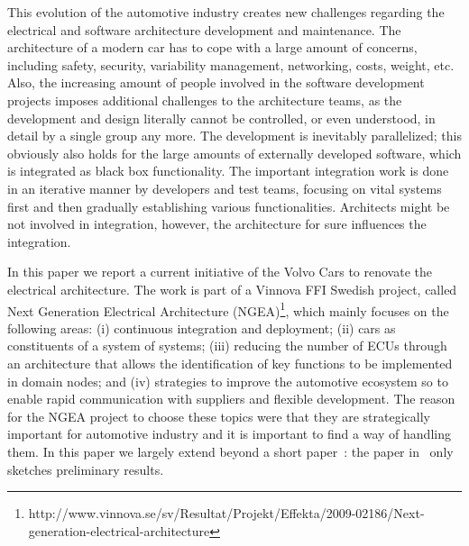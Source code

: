 \documentclass[preprint,12pt,3p]{elsarticle}
\newcommand\eric[1]{\nb{Eric}{#1}}
\begin{document}
This evolution of the automotive industry %
creates new challenges regarding the electrical and software
architecture development and maintenance. 
The architecture of a modern car has to cope with a large amount of concerns, including safety, security, variability management, networking, costs, weight, etc.
Also, the increasing amount of people
involved in the software development projects imposes additional challenges to the
architecture teams, as the development and design literally cannot be
controlled, or even understood, in detail by a single group any more. The
development is inevitably parallelized; %
this obviously also holds for the large
amounts of externally developed software, which is integrated as black box
functionality. The important integration work is done in an iterative manner by
developers and test teams, focusing on vital systems first and then gradually
establishing various functionalities. Architects might be not involved in integration, 
however, the architecture for sure influences the integration.

In this paper we report a current initiative of the Volvo Cars to renovate the
electrical architecture. 
The work is part of a Vinnova FFI Swedish project, called Next Generation Electrical Architecture
 (NGEA)\footnote{http://www.vinnova.se/sv/Resultat/Projekt/Effekta/2009-02186/Next-generation-electrical-architecture},
which mainly focuses on the following areas: (i) continuous integration and deployment; (ii)
cars as constituents of a system of systems; (iii) reducing the number of ECUs through an architecture that allows the identification of key functions to be implemented in domain nodes; and (iv) strategies to improve the automotive ecosystem so to enable rapid communication with suppliers and flexible development. The reason for the NGEA project to choose these topics were that they are strategically important for automotive industry and it is important to find a way of handling them. In this paper we largely extend beyond a short paper~\cite{WasaPaper}: the paper in~\cite{WasaPaper} only sketches preliminary results.
 
\end{document}
